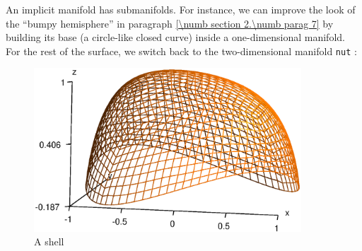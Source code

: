 An implicit manifold has submanifolds.
For instance, we can improve the look of the ``bumpy hemisphere'' in paragraph
\ref{\numb section 2.\numb parag 7} by building its base (a circle-like closed curve)
inside a one-dimensional manifold.
For the rest of the surface, we switch back to the two-dimensional manifold {\small\tt nut} :
\medskip

\begin{figure}[ht] \centering
  \includegraphics[width=100mm]{bumpy}
  \caption{A shell}
  \label{\numb section 2.\numb fig 16}
\end{figure}


